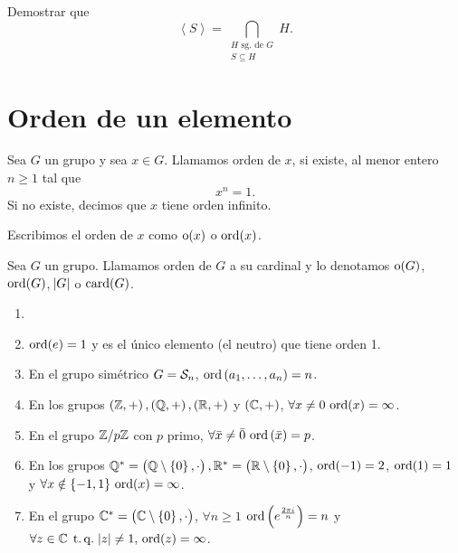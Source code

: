 \begin{ej}
    Demostrar que
    \[
        \left<S\right> = \bigcap_{\substack{H \text{ sg. de } G \\ S \subseteq H}} H.
    \]
\end{ej}

\section{Orden de un elemento}

\begin{defi}
    Sea $G$ un grupo y sea $x \in G$. Llamamos orden de $x$, si existe, al menor entero $n \geq 1$ tal que
    \[
        x^n = 1.
    \]
    Si no existe, decimos que $x$ tiene orden infinito.
\end{defi}

\begin{obs}
    Escribimos el orden de $x$ como $\operatorname{o}(x)$ o $\operatorname{ord}(x)$.
\end{obs}

\begin{defi}
    Sea $G$ un grupo. Llamamos orden de $G$ a su cardinal y lo denotamos $\operatorname{o}(G)$, $\operatorname{ord}(G)$, $\abs{G}$ o $\operatorname{card}(G)$.
\end{defi}

\begin{example}
    \begin{enumerate}[1.]
        \item[]
        \item $\operatorname{ord}(e) = 1$ y es el único elemento (el neutro) que tiene orden 1.
        \item En el grupo simétrico $G = \mathcal{S}_n$, $\operatorname{ord}\left( a_1, \dots, a_n \right) = n$.
        \item En los grupos $\left( \mathbb{Z}, +\right) , \left( \mathbb{Q}, +\right), \left( \mathbb{R}, +\right)$ y $\left( \mathbb{C}, +\right)$, $\forall x \neq 0 \, \operatorname{ord}(x) = \infty$.
        \item En el grupo $\mathbb{Z}/p\mathbb{Z}$ con $p$ primo, $\forall \bar{x} \neq \bar{0} \, \operatorname{ord}\left( \bar{x} \right) = p$.
        \item En los grupos $\mathbb{Q}^{\ast}=\left( \mathbb{Q}\setminus \left\{ 0\right\}, \cdot \right), \mathbb{R}^{\ast}=\left( \mathbb{R}\setminus \left\{ 0\right\}, \cdot\right)$, $\operatorname{ord}(-1) = 2$, $\operatorname{ord}(1) = 1$ y $\forall x \notin \left\{-1, 1\right\} \, \operatorname{ord}(x) = \infty$.
        \item En el grupo $\mathbb{C}^{\ast}=\left( \mathbb{C}\setminus \left\{ 0\right\}, \cdot \right)$, $\forall n \geq 1$ $\operatorname{ord}\left( e^{\frac{2 \pi i}{n}} \right) = n$ y $\forall z \in \mathbb{C} \operatorname{\;t.q.\;} \abs{z} \neq 1, \, \operatorname{ord}(z) = \infty$.
    \end{enumerate}
\end{example}

